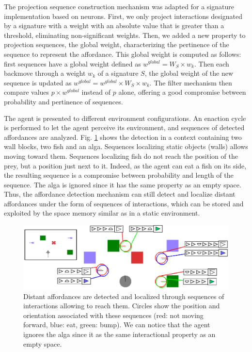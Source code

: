 \documentclass[conference]{IEEEtran}
\begin{document}
The projection sequence construction mechanism was adapted for a signature implementation based on neurons. First, we only project interactions designated by a signature with a weight with an absolute value that is greater than a threshold, eliminating non-significant weights. Then, we added a new property to projection sequences, the global weight, characterizing the pertinence of the sequence to represent the affordance. This global weight is computed as follows: first sequences have a global weight defined as $w^{global} = W_S \times w_k$. Then each backmove through a weight $w_k$ of a signature $S$, the global weight of the new sequence is updated as $w^{global}=w^{global} \times  W_S \times w_k$. The filter mechanism then compare values $p \times w^{global}$ instead of $p$ alone, offering a good compromise between probability and pertinence of sequences.


The agent is presented to different environment configurations. An enaction cycle is performed to let the agent perceive its environment, and sequences of detected affordances are analyzed.
Fig. \ref{fig:detect} shows the detection in a context containing two wall blocks, two fish and an alga. Sequences localizing static objects (walls) allows moving toward them. 
Sequences localizing fish do not reach the position of the prey, but a position just next to it. 
Indeed, as the agent can eat a fish on its side, the resulting sequence is a compromise between probability and length of the sequence. 
The alga is ignored since it has the same property as an empty space. 
Thus, the affordance detection mechanism can still detect and localize distant affordances under the form of sequences of interactions, which can be stored and exploited by the space memory similar as in a static environment.



\begin{figure}[htbp]
\centerline{\includegraphics[scale=0.4]{img/detection.pdf}}
\caption{Distant affordances are detected and localized through sequences of interactions allowing to reach them. Circles show the position and orientation associated with these sequences (red: not moving forward, blue: eat, green: bump). 
We can notice that the agent ignores the alga since it as the same interactional property as an empty space.}
\label{fig:detect}
\end{figure}
\end{document}
